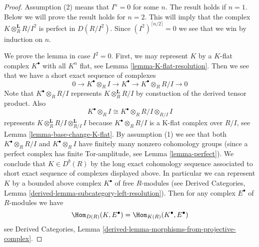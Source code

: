 \begin{proof}
Assumption (2) means that $I^n = 0$ for some $n$. The result holds if $n = 1$.
Below we will prove the result holds for $n = 2$. This will imply that the
complex $K \otimes_R^\mathbf{L} R/I^2$ is perfect in $D(R/I^2)$. Since
$(I^2)^{\lceil n/2 \rceil} = 0$ we see that we win by induction on $n$.

\medskip\noindent
We prove the lemma in case $I^2 = 0$. First, we may represent $K$
by a $K$-flat complex $K^\bullet$ with all $K^n$ flat, see
Lemma \ref{lemma-K-flat-resolution}. Then we see that we have a short
exact sequence of complexes
$$
0 \to
K^\bullet \otimes_R I \to
K^\bullet \to
K^\bullet \otimes_R R/I \to 0
$$
Note that $K^\bullet \otimes_R R/I$ represents $K \otimes^\mathbf{L}_R R/I$
by constuction of the derived tensor product. Also
$$
K^\bullet \otimes_R I \cong K^\bullet \otimes_R R/I \otimes_{R/I} I
$$
represents $K \otimes^\mathbf{L}_R R/I \otimes^\mathbf{L}_{R/I} I$
because $K^\bullet \otimes_R R/I$ is a K-flat complex over $R/I$, see
Lemma \ref{lemma-base-change-K-flat}.
By assumption (1) we see that both $K^\bullet \otimes_R R/I$ and
$K^\bullet \otimes_R I$ have finitely many nonzero cohomology groups
(since a perfect complex has finite Tor-amplitude, see
Lemma \ref{lemma-perfect}). We conclude that $K \in D^b(R)$ by the
long exact cohomology sequence associated to short exact sequence
of complexes displayed above. In particular we can represent $K$
by a bounded above complex $K^\bullet$ of free $R$-modules (see
Derived Categories, Lemma \ref{derived-lemma-subcategory-left-resolution}).
Then for any complex $E^\bullet$ of $R$-modules we have
$$
\Hom_{D(R)}(K, E^\bullet) = \Hom_{K(R)}(K^\bullet, E^\bullet)
$$
see Derived Categories,
Lemma \ref{derived-lemma-morphisms-from-projective-complex}.


\end{proof}
